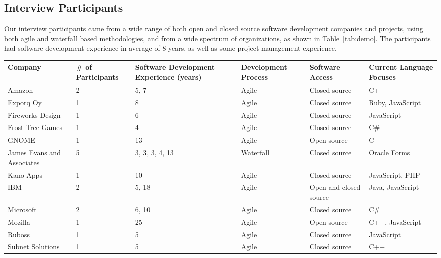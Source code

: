 \documentclass[conference]{IEEEtran}
\begin{document}
\subsection{Interview Participants}

Our interview participants came from a wide range of both open and closed source software development companies
and projects, using both  agile and waterfall based methodologies, and from a wide spectrum of organizations, as shown in Table~\ref{tab:demo}.
The participants had software development experience in average of 8 years, as well as some project management experience.

\begin{table*}[tb!]
\begin{center}
\begin{tabular}{| l | p{1cm} | p{2cm} | p{2cm} | p{2cm} | p{2cm} |}
\hline
Company & \# of Participants & Software Development Experience (years) & Development Process & Software Access & Current Language Focuses \\
\hline
\hline
Amazon & 2 & 5, 7 & Agile & Closed source & C++ \\ \hline
Exporq Oy & 1 & 8 & Agile & Closed source & Ruby, JavaScript \\ \hline
Fireworks Design & 1 & 6 & Agile & Closed source & JavaScript \\ \hline
Frost Tree Games & 1 & 4 & Agile & Closed source & C\# \\ \hline
GNOME & 1 & 13 & Agile & Open source & C \\ \hline
James Evans and Associates & 5 & 3, 3, 3, 4, 13 & Waterfall & Closed source & Oracle Forms \\ \hline
Kano Apps & 1 & 10 & Agile & Closed source & JavaScript, PHP \\ \hline
IBM & 2 & 5, 18 & Agile & Open and closed source & Java, JavaScript \\ \hline
Microsoft & 2 & 6, 10 & Agile & Closed source & C\# \\ \hline
Mozilla & 1 & 25 & Agile & Open source & C++, JavaScript \\ \hline
Ruboss & 1 & 5 & Agile & Closed source & JavaScript \\ \hline
Subnet Solutions & 1 & 5 & Agile & Closed source & C++ \\ \hline

\end{tabular}
\end{center}
\caption{Demographic information of interview participants.\label{tab:demo}}
\end{table*}
\end{document}

